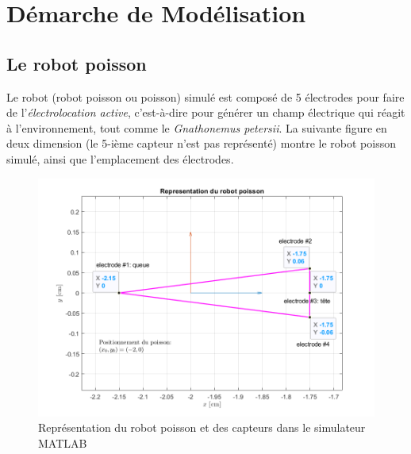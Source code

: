 \section{Démarche de Modélisation}
\subsection{Le robot poisson}

Le robot (robot poisson ou poisson) simulé est composé de 5 électrodes pour faire de l'\textit{électrolocation active}, c'est-à-dire pour générer un champ électrique qui réagit à l'environnement, tout comme le \textit{Gnathonemus petersii}. La suivante figure en deux dimension (le 5-ième capteur n'est pas représenté) montre le robot poisson simulé, ainsi que l'emplacement des électrodes. 

\begin{figure}[h!]
    \centering
    \includegraphics[width=\textwidth]{assets/poisson/poisson.png}
    \caption{Représentation du robot poisson et des capteurs dans le simulateur MATLAB}
    \label{fig:poisson}
\end{figure}

